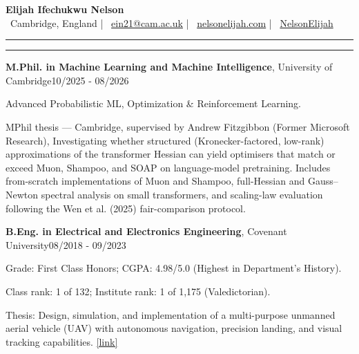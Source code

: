 \documentclass[11pt, a4paper]{article}
\newcommand{\entrytitle}[3]{
    \noindent\textbf{#1}, #2\hfill#3
}
\newcommand{\sectiontitle}[1]{\vspace{1mm}{\color{primaryColor}\noindent\textbf{#1}}\vspace{1.5mm}\hrule\vspace{1mm}}
\begin{document}
\begin{center}
    \LARGE{\textbf{\color{primaryColor}Elijah Ifechukwu Nelson}}\\
    \vspace{2mm}
    \normalsize{
        \faMapMarker*~Cambridge, England \quad|\quad
        \faEnvelope~\href{mailto:ein21@cam.ac.uk}{ein21@cam.ac.uk} \quad|\quad
        \faGlobe~\href{https://www.nelsonelijah.com}{nelsonelijah.com} \quad|\quad
        \faLinkedin~\href{https://www.linkedin.com/in/nelson-elijah/}{NelsonElijah}
    }
\end{center}

\sectiontitle{Summary}
\noindent



\sectiontitle{Education}

\entrytitle{M.Phil. in Machine Learning and Machine Intelligence}{University of Cambridge}{10/2025 - 08/2026}
\begin{details}
    \item Advanced Probabilistic ML, Optimization \& Reinforcement Learning. 
    \item MPhil thesis — Cambridge, supervised by Andrew Fitzgibbon (Former Microsoft Research), Investigating whether structured (Kronecker-factored, low-rank) approximations of the transformer Hessian can yield optimisers that match or exceed Muon, Shampoo, and SOAP on language-model pretraining. Includes from-scratch implementations of Muon and Shampoo, full-Hessian and Gauss–Newton spectral analysis on small transformers, and scaling-law evaluation following the Wen et al. (2025) fair-comparison protocol.
\end{details}

\entrytitle{B.Eng. in Electrical and Electronics Engineering}{Covenant University}{08/2018 - 09/2023}
\begin{details}
    \item Grade: First Class Honors; CGPA: 4.98/5.0 (Highest in Department's History).
    \item Class rank: 1 of 132; Institute rank: 1 of 1{,}175 (Valedictorian).
    \item Thesis: Design, simulation, and implementation of a multi-purpose unmanned aerial vehicle (UAV) with autonomous navigation, precision landing, and visual tracking capabilities. \href{https://www.nelsonelijah.com/projects/autouav}{[link]}
\end{details}
\end{document}
